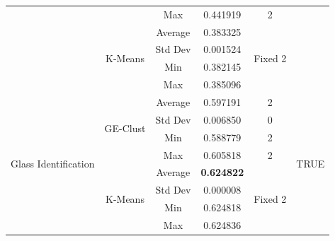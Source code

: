 \documentclass[conference,compsoc]{IEEEtran}
\begin{document}
\begin{table}[]
\begin{tabular}{|c|c|c|c|c|c|}
		&                               & Max                            & 0.441919                     & 2                        &                       \\ \cline{2-5}
		& \multirow{4}{*}{K-Means}      & Average                        & 0.383325                    & \multirow{4}{*}{Fixed 2} &                       \\ \cline{3-4}
		&                               & Std Dev                        & 0.001524                    &                          &                       \\ \cline{3-4}
		&                               & Min                            & 0.382145                    &                          &                       \\ \cline{3-4}
		&                               & Max                            & 0.385096                    &                          &                       \\ \hline
		\multirow{8}{*}{Glass Identification}  & \multirow{4}{*}{GE-Clust}           & Average                        & 0.597191                    & 2                        & \multirow{8}{*}{TRUE} \\ \cline{3-5}
		&                               & Std Dev                        & 0.006850                    & 0                        &                       \\ \cline{3-5}
		&                               & Min                            & 0.588779                    & 2                        &                       \\ \cline{3-5}
		&                               & Max                            & 0.605818                    & 2                        &                       \\ \cline{2-5}
		& \multirow{4}{*}{K-Means}      & Average                        & \textbf{0.624822}                    & \multirow{4}{*}{Fixed 2} &                       \\ \cline{3-4}
		&                               & Std Dev                        & 0.000008                    &                          &                       \\ \cline{3-4}
		&                               & Min                            & 0.624818                    &                          &                       \\ \cline{3-4}
		&                               & Max                            & 0.624836                    &                          &                       \\ \hline

\end{tabular}
\end{table}
\end{document}
